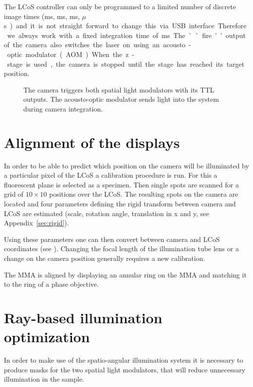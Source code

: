 The LCoS controller can only be programmed to a limited number of
discrete image times (\unit[20]{ms}, \unit[10]{ms}, \unit[5]{ms},
\unit[200]{$\mu$s}) and it is not straight forward to change this via
USB interface. Therefore we always work with a fixed integration time
of \unit[20]{ms}. The ``fire'' output of the camera also switches the
laser on using an acousto-optic modulator (AOM).

When the z-stage is used, the camera is stopped until the stage has
reached its target position.

\begin{figure}[!hbt]
  \centering
  
  \caption{The camera triggers both spatial light modulators with its
    TTL outputs. The acousto-optic modulator sends light into the
    system during camera integration.}
  \label{fig:memi-electronics}
\end{figure}

\section{Alignment of the displays}

In order to be able to predict which position on the camera will be
illuminated by a particular pixel of the LCoS a calibration procedure
is run. For this a fluorescent plane is selected as a specimen. Then
single spots are scanned for a grid of $10\times10$ positions over the
LCoS. The resulting spots on the camera are located and four
parameters defining the rigid transform between camera and LCoS are
estimated (scale, rotation angle, translation in x and y, see
Appendix~\ref{sec:rigid}).

Using these parameters one can then convert between camera and LCoS
coordinates (see ). Changing the focal
length of the illumination tube lens or a change on the camera position
generally requires a new calibration.


The MMA is aligned by displaying an annular ring on the MMA and
matching it to the ring of a phase objective.


\section{Ray-based illumination optimization}
In order to make use of the spatio-angular illumination system it is
necessary to produce masks for the two spatial light modulators, that
will reduce unnecessary illumination in the sample.

